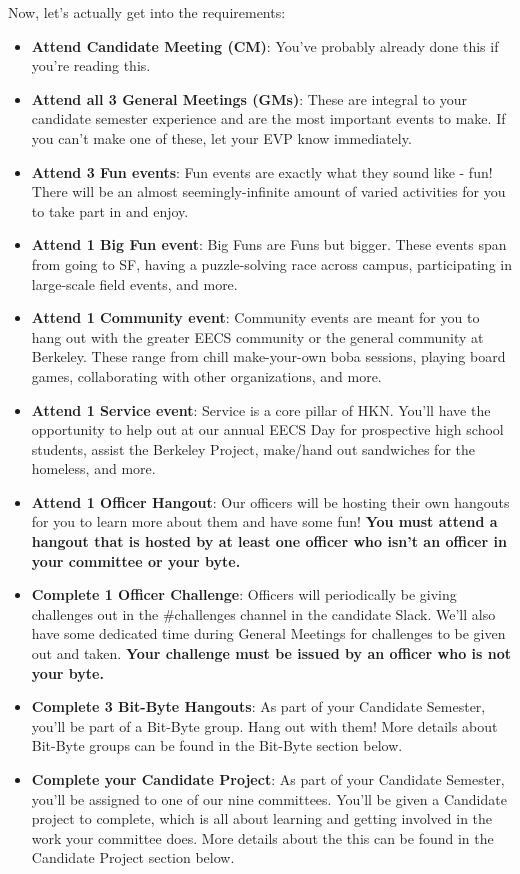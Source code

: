 \documentclass[11pt, article, oneside]{memoir}
\begin{document}
        \bigbreak

        Now, let's actually get into the requirements:
            \begin{itemize}
                \item \textbf{Attend Candidate Meeting (CM)}: You've probably already done this if you're reading this.
                \item \textbf{Attend all 3 General Meetings (GMs)}: These are integral to your candidate semester experience and are the most important events to make. If you can't make one of these, let your EVP know immediately.
                \item \textbf{Attend 3 Fun events}: Fun events are exactly what they sound like - fun! There will be an almost seemingly-infinite amount of varied activities for you to take part in and enjoy.
                \item \textbf{Attend 1 Big Fun event}: Big Funs are Funs but bigger. These events span from going to SF, having a puzzle-solving race across campus, participating in large-scale field events, and more.
                \item \textbf{Attend 1 Community event}: Community events are meant for you to hang out with the greater EECS community or the general community at Berkeley. These range from chill make-your-own boba sessions, playing board games, collaborating with other organizations, and more.
                \item \textbf{Attend 1 Service event}: Service is a core pillar of HKN. You'll have the opportunity to help out at our annual EECS Day for prospective high school students, assist the Berkeley Project, make/hand out sandwiches for the homeless, and more.
                \item \textbf{Attend 1 Officer Hangout}: Our officers will be hosting their own hangouts for you to learn more about them and have some fun! \textbf{You must attend a hangout that is hosted by at least one officer who isn't an officer in your committee or your byte.}
                \item \textbf{Complete 1 Officer Challenge}: Officers will periodically be giving challenges out in the \#challenges channel in the candidate Slack. We'll also have some dedicated time during General Meetings for challenges to be given out and taken. \textbf{Your challenge must be issued by an officer who is not your byte.}
                \item \textbf{Complete 3 Bit-Byte Hangouts}: As part of your Candidate Semester, you'll be part of a Bit-Byte group. Hang out with them! More details about Bit-Byte groups can be found in the Bit-Byte section below.
                \item \textbf{Complete your Candidate Project}: As part of your Candidate Semester, you'll be assigned to one of our nine committees. You'll be given a Candidate project to complete, which is all about learning and getting involved in the work your committee does. More details about the this can be found in the Candidate Project section below.
            \end{itemize}
\end{document}
